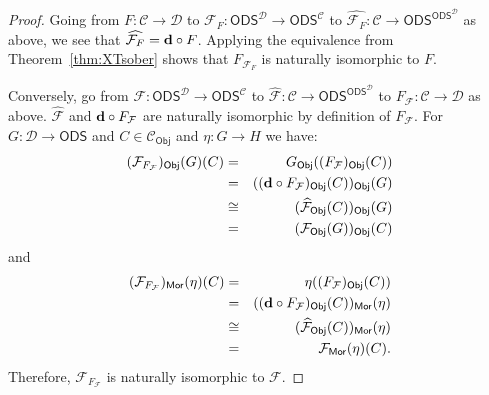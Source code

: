 \documentclass[10pt,a4paper]{amsart}
\newcommand{\Mor}{\mathsf{Mor}}
\newcommand{\ODS}{{\mathsf{ODS}}}
\newcommand{\Obj}{\mathsf{Obj}}
\def\cal#1{{\mathcal #1}}
\def\calC{{\cal C}}
\def\calD{{\cal D}}
\def\calF{{\cal F}}
\newcommand{\y}{{\mathsf{\bf d}}}
\begin{document}
\begin{proof}
Going from $F\colon \calC\to\calD$ to $\calF_F\colon\ODS^\calD \to \ODS^\calC$ to $\widehat{\calF_F}\colon \calC\to \ODS^{\ODS^\calD}$ as above, we see that $\widehat{\calF_F} = \y\circ F$. Applying the equivalence from Theorem~\ref{thm:XTsober} shows that $F_{\calF_F}$ is naturally isomorphic to $F$.

Conversely, go from $\calF\colon\ODS^\calD \to \ODS^\calC$ to $\widehat{\calF}\colon \calC\to \ODS^{\ODS^\calD}$ to $F_\calF\colon \calC\to\calD$ as above. $\widehat{\calF}$ and $\y\circ F_\calF$ are naturally isomorphic by definition of $F_\calF$. For $G\colon \calD\to\ODS$ and $C\in\calC_\Obj$ and $\eta\colon G\to H$ we have:
\begin{eqnarray*}
(\calF_{F_\calF})_\Obj(G)(C) &=& G_\Obj((F_\calF)_\Obj(C))\\
&=& ((\y\circ F_\calF)_\Obj(C))_\Obj(G)\\
&\cong& (\widehat{\calF}_\Obj(C))_\Obj(G)\\
&=& (\calF_\Obj(G))_\Obj(C)
\end{eqnarray*}
and
\begin{eqnarray*}
(\calF_{F_\calF})_\Mor(\eta)(C) &=& \eta((F_\calF)_\Obj(C))\\
&=& ((\y\circ F_\calF)_\Obj(C))_\Mor(\eta)\\
&\cong& (\widehat{\calF}_\Obj(C))_\Mor(\eta)\\
&=& \calF_\Mor(\eta)(C).
\end{eqnarray*}
Therefore, $\calF_{F_\calF}$ is naturally isomorphic to $\calF$.
\end{proof}
\end{document}
